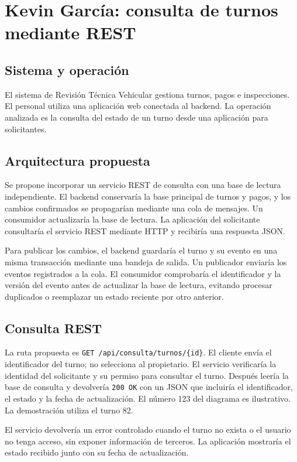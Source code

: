 \section{Kevin García: consulta de turnos mediante REST}

\subsection{Sistema y operación}
El sistema de Revisión Técnica Vehicular gestiona turnos, pagos e inspecciones. El personal utiliza una aplicación web conectada al backend. La operación analizada es la consulta del estado de un turno desde una aplicación para solicitantes.

\subsection{Arquitectura propuesta}
Se propone incorporar un servicio REST de consulta con una base de lectura independiente. El backend conservaría la base principal de turnos y pagos, y los cambios confirmados se propagarían mediante una cola de mensajes. Un consumidor actualizaría la base de lectura. La aplicación del solicitante consultaría el servicio REST mediante HTTP y recibiría una respuesta JSON.

Para publicar los cambios, el backend guardaría el turno y su evento en una misma transacción mediante una bandeja de salida. Un publicador enviaría los eventos registrados a la cola. El consumidor comprobaría el identificador y la versión del evento antes de actualizar la base de lectura, evitando procesar duplicados o reemplazar un estado reciente por otro anterior.

\subsection{Consulta REST}
La ruta propuesta es \texttt{GET /api/consulta/turnos/\{id\}}. El cliente envía el identificador del turno; no selecciona al propietario. El servicio verificaría la identidad del solicitante y su permiso para consultar el turno. Después leería la base de consulta y devolvería \texttt{200 OK} con un JSON que incluiría el identificador, el estado y la fecha de actualización. El número 123 del diagrama es ilustrativo. La demostración utiliza el turno 82.

El servicio devolvería un error controlado cuando el turno no exista o el usuario no tenga acceso, sin exponer información de terceros. La aplicación mostraría el estado recibido junto con su fecha de actualización.

